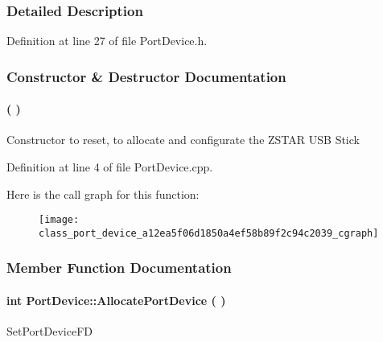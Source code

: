 \begin{appendices}
\subsubsection{\-Detailed \-Description}


\-Definition at line 27 of file \-Port\-Device.\-h.



\subsubsection{\-Constructor \& \-Destructor \-Documentation}
\paragraph[{\-Port\-Device}]{ (
)}\label{class_port_device_a12ea5f06d1850a4ef58b89f2c94c2039}
\-Constructor to reset, to allocate and configurate the \-Z\-S\-T\-A\-R \-U\-S\-B \-Stick 

\-Definition at line 4 of file \-Port\-Device.\-cpp.



\-Here is the call graph for this function\-:\nopagebreak
\begin{figure}[H]
\begin{center}
\leavevmode
\texttt{[image: class\_port\_device\_a12ea5f06d1850a4ef58b89f2c94c2039\_cgraph]}
\end{center}
\end{figure}




\subsubsection{\-Member \-Function \-Documentation}
\paragraph[{\-Allocate\-Port\-Device}]{\setlength{\rightskip}{0pt plus 5cm}int {\bf \-Port\-Device\-::\-Allocate\-Port\-Device} (
)}\label{class_port_device_ac93ffc96c1a14ee5d4b9eed9fb17d103}
\-Set\-Port\-Device\-F\-D 


\end{appendices}
